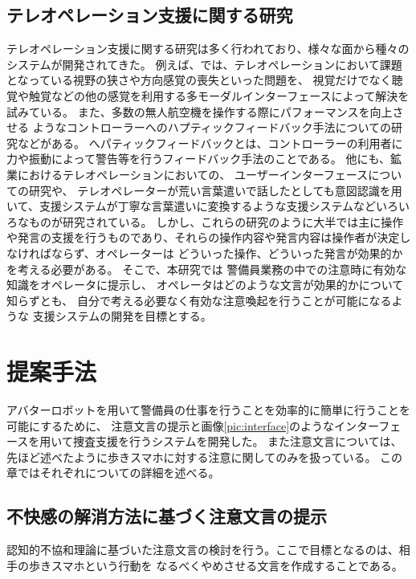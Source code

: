 \documentclass[11pt,a4j]{jreport}
\begin{document}
\section{テレオペレーション支援に関する研究}
テレオペレーション支援に関する研究は多く行われており、様々な面から種々のシステムが開発されてきた。
例えば、\cite{chen2007human,triantafyllidis2020study}では、テレオペレーションにおいて課題となっている視野の狭さや方向感覚の喪失といった問題を、
視覚だけでなく聴覚や触覚などの他の感覚を利用する多モーダルインターフェースによって解決を試みている。
また、多数の無人航空機を操作する際にパフォーマンスを向上させる
ようなコントローラーへのハプティックフィードバック手法についての研究\cite{son2011measuring}などがある。
へパティックフィードバックとは、コントローラーの利用者に力や振動によって警告等を行うフィードバック手法のことである。
他にも、鉱業におけるテレオペレーションにおいての、
ユーザーインターフェースについての研究\cite{hainsworth2001teleoperation}や、
テレオペレーターが荒い言葉遣いで話したとしても意図認識を用いて、支援システムが丁寧な言葉遣いに変換するような支援システム\cite{Daneshmand2023}などいろいろなものが研究されている。
しかし、これらの研究のように大半では主に操作や発言の支援を行うものであり、それらの操作内容や発言内容は操作者が決定しなければならず、オペレーターは
どういった操作、どういった発言が効果的かを考える必要がある。
そこで、本研究では
警備員業務の中での注意時に有効な知識をオペレータに提示し、
オペレータはどのような文言が効果的かについて知らずとも、
自分で考える必要なく有効な注意喚起を行うことが可能になるような
支援システムの開発を目標とする。


\chapter{提案手法}



アバターロボットを用いて警備員の仕事を行うことを効率的に簡単に行うことを可能にするために、
注意文言の提示と画像\ref{pic:interface}のようなインターフェースを用いて捜査支援を行うシステムを開発した。
また注意文言については、先ほど述べたように歩きスマホに対する注意に関してのみを扱っている。
この章ではそれぞれについての詳細を述べる。

\section{不快感の解消方法に基づく注意文言の提示}
認知的不協和理論に基づいた注意文言の検討を行う。ここで目標となるのは、相手の歩きスマホという行動を
なるべくやめさせる文言を作成することである。
\end{document}

